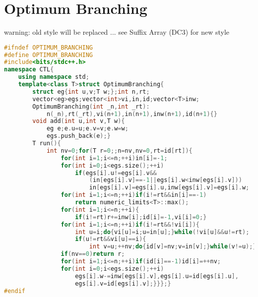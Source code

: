 \documentclass{book}
\begin{document}
\section{Optimum Branching}
warning: old style will be replaced ... see Suffix Array (DC3) for new style\begin{lstlisting}[language=C++,title={Optimum Branching.hpp (1556 bytes, 34 lines)}]
#ifndef OPTIMUM_BRANCHING
#define OPTIMUM_BRANCHING
#include<bits/stdc++.h>
namespace CTL{
    using namespace std;
    template<class T>struct OptimumBranching{
        struct eg{int u,v;T w;};int n,rt;
        vector<eg>egs;vector<int>vi,in,id;vector<T>inw;
        OptimumBranching(int _n,int _rt):
            n(_n),rt(_rt),vi(n+1),in(n+1),inw(n+1),id(n+1){}
        void add(int u,int v,T w){
            eg e;e.u=u;e.v=v;e.w=w;
            egs.push_back(e);}
        T run(){
            int nv=0;for(T r=0;;n=nv,nv=0,rt=id[rt]){
                for(int i=1;i<=n;++i)in[i]=-1;
                for(int i=0;i<egs.size();++i)
                    if(egs[i].u!=egs[i].v&&
                        (in[egs[i].v]==-1||egs[i].w<inw[egs[i].v]))
                        in[egs[i].v]=egs[i].u,inw[egs[i].v]=egs[i].w;
                for(int i=1;i<=n;++i)if(i!=rt&&in[i]==-1)
                    return numeric_limits<T>::max();
                for(int i=1;i<=n;++i){
                    if(i!=rt)r+=inw[i];id[i]=-1,vi[i]=0;}
                for(int i=1;i<=n;++i)if(i!=rt&&!vi[i]){
                    int u=i;do{vi[u]=i;u=in[u];}while(!vi[u]&&u!=rt);
                    if(u!=rt&&vi[u]==i){
                        int v=u;++nv;do{id[v]=nv;v=in[v];}while(v!=u);}}
                if(nv==0)return r;
                for(int i=1;i<=n;++i)if(id[i]==-1)id[i]=++nv;
                for(int i=0;i<egs.size();++i)
                    egs[i].w-=inw[egs[i].v],egs[i].u=id[egs[i].u],
                    egs[i].v=id[egs[i].v];}}};}
#endif\end{lstlisting}
\end{document}
